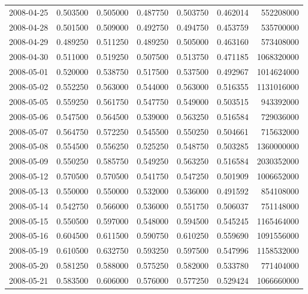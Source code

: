 \begin{tabular}{lrrrrrr}
2008-04-25 &    0.503500 &    0.505000 &    0.487750 &    0.503750 &    0.462014 &   552208000 \\
2008-04-28 &    0.501500 &    0.509000 &    0.492750 &    0.494750 &    0.453759 &   535700000 \\
2008-04-29 &    0.489250 &    0.511250 &    0.489250 &    0.505000 &    0.463160 &   573408000 \\
2008-04-30 &    0.511000 &    0.519250 &    0.507500 &    0.513750 &    0.471185 &  1068320000 \\
2008-05-01 &    0.520000 &    0.538750 &    0.517500 &    0.537500 &    0.492967 &  1014624000 \\
2008-05-02 &    0.552250 &    0.563000 &    0.544000 &    0.563000 &    0.516355 &  1131016000 \\
2008-05-05 &    0.559250 &    0.561750 &    0.547750 &    0.549000 &    0.503515 &   943392000 \\
2008-05-06 &    0.547500 &    0.564500 &    0.539000 &    0.563250 &    0.516584 &   729036000 \\
2008-05-07 &    0.564750 &    0.572250 &    0.545500 &    0.550250 &    0.504661 &   715632000 \\
2008-05-08 &    0.554500 &    0.556250 &    0.525250 &    0.548750 &    0.503285 &  1360000000 \\
2008-05-09 &    0.550250 &    0.585750 &    0.549250 &    0.563250 &    0.516584 &  2030352000 \\
2008-05-12 &    0.570500 &    0.570500 &    0.541750 &    0.547250 &    0.501909 &  1006652000 \\
2008-05-13 &    0.550000 &    0.550000 &    0.532000 &    0.536000 &    0.491592 &   854108000 \\
2008-05-14 &    0.542750 &    0.566000 &    0.536000 &    0.551750 &    0.506037 &   751148000 \\
2008-05-15 &    0.550500 &    0.597000 &    0.548000 &    0.594500 &    0.545245 &  1165464000 \\
2008-05-16 &    0.604500 &    0.611500 &    0.590750 &    0.610250 &    0.559690 &  1091556000 \\
2008-05-19 &    0.610500 &    0.632750 &    0.593250 &    0.597500 &    0.547996 &  1158532000 \\
2008-05-20 &    0.581250 &    0.588000 &    0.575250 &    0.582000 &    0.533780 &   771404000 \\
2008-05-21 &    0.583500 &    0.606000 &    0.576000 &    0.577250 &    0.529424 &  1066660000 \\

\end{tabular}
